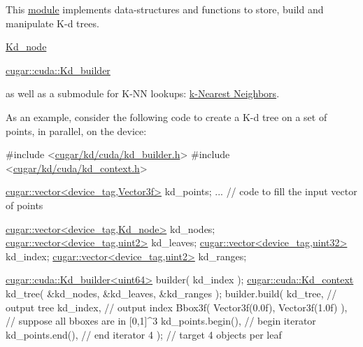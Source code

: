 \begin{DoxyParagraph}{}
This \hyperlink{group__kdtree}{module} implements data-\/structures and functions to store, build and manipulate K-\/d trees.
\end{DoxyParagraph}

\begin{DoxyItemize}
\item \hyperlink{structcugar_1_1_kd__node}{Kd\+\_\+node}
\item \hyperlink{structcugar_1_1cuda_1_1_kd__builder}{cugar\+::cuda\+::\+Kd\+\_\+builder}
\end{DoxyItemize}

\begin{DoxyParagraph}{}
as well as a submodule for K-\/\+NN lookups\+: \hyperlink{group__knn}{k-\/\+Nearest Neighbors}. 
\end{DoxyParagraph}
\begin{DoxyParagraph}{}
As an example, consider the following code to create a K-\/d tree on a set of points, in parallel, on the device\+: 
\begin{DoxyCode}
\textcolor{preprocessor}{#include <\hyperlink{kd__builder_8h}{cugar/kd/cuda/kd\_builder.h}>}
\textcolor{preprocessor}{#include <\hyperlink{kd__context_8h}{cugar/kd/cuda/kd\_context.h}>}

\hyperlink{structcugar_1_1vector}{cugar::vector<device\_tag,Vector3f>} kd\_points;
... \textcolor{comment}{// code to fill the input vector of points}

\hyperlink{structcugar_1_1vector}{cugar::vector<device\_tag,Kd\_node>}  kd\_nodes;
\hyperlink{structcugar_1_1vector}{cugar::vector<device\_tag,uint2>}    kd\_leaves;
\hyperlink{structcugar_1_1vector}{cugar::vector<device\_tag,uint32>}   kd\_index;
\hyperlink{structcugar_1_1vector}{cugar::vector<device\_tag,uint2>}    kd\_ranges;

\hyperlink{structcugar_1_1cuda_1_1_kd__builder}{cugar::cuda::Kd\_builder<uint64>} builder( kd\_index );
\hyperlink{structcugar_1_1cuda_1_1_kd__context}{cugar::cuda::Kd\_context} kd\_tree( &kd\_nodes, &kd\_leaves, &kd\_ranges );
builder.build(
    kd\_tree,                                    \textcolor{comment}{// output tree}
    kd\_index,                                   \textcolor{comment}{// output index}
    Bbox3f( Vector3f(0.0f), Vector3f(1.0f) ),   \textcolor{comment}{// suppose all bboxes are in [0,1]^3}
    kd\_points.begin(),                          \textcolor{comment}{// begin iterator}
    kd\_points.end(),                            \textcolor{comment}{// end iterator}
    4 );                                        \textcolor{comment}{// target 4 objects per leaf}
\end{DoxyCode}
 
\end{DoxyParagraph}
